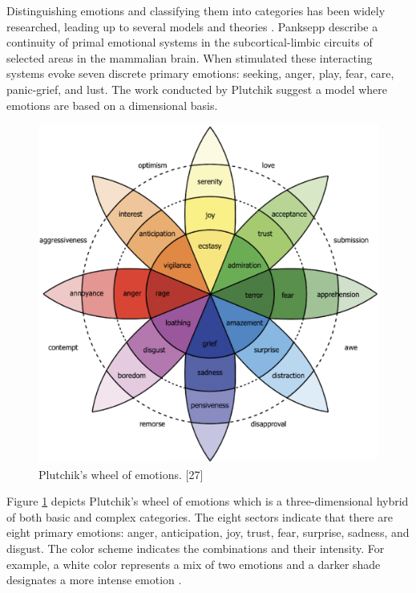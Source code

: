 Distinguishing emotions and classifying them into categories has been widely researched, leading up to several models and theories  \cite{cross_cultural} \cite{HP_RPP} \cite{HP_Advanced}. Panksepp \cite{panksepp_book} describe a continuity of primal emotional systems in the subcortical-limbic circuits of selected areas in the mammalian brain. When stimulated these interacting systems evoke seven discrete primary emotions: seeking, anger, play, fear, care, panic-grief, and lust. The work conducted by Plutchik \cite{plutchik_model} suggest a model where emotions are based on a dimensional basis. 
%
\begin{figure}[h]
  \centering
  \includegraphics[width=\textwidth]{figures/plutchiks_model.png}
  \caption{Plutchik's wheel of emotions. [27]}
  \label{fig:plutchik}
\end{figure}
%
Figure \ref{fig:plutchik} depicts Plutchik's wheel of emotions which is a three-dimensional hybrid of both basic and complex categories. The eight sectors indicate that there are eight primary emotions: anger, anticipation, joy, trust, fear, surprise, sadness, and disgust. The color scheme indicates the combinations and their intensity. For example, a white color represents a mix of two emotions and a darker shade designates a more intense emotion \cite{HP_RPP} \cite{HP_Advanced}. \\

